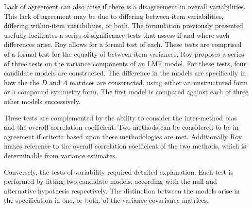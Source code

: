\documentclass[12pt, a4paper]{report}
\theoremstyle{plain}
\theoremstyle{definition}
\theoremstyle{remark}
\begin{document}
Lack of agreement can also arise if there is a disagreement in overall variabilities. This lack of agreement may be due to differing between-item variabilities, differing within-item variabilities, or both. The formulation previously presented usefully facilitates a series of significance tests that assess if and where such differences arise. Roy allows for a formal test of each. These tests are comprised of a formal test for the equality of between-item variances,
Roy proposes a series of three tests on the variance components of an LME model. For these tests, four candidate models are constructed. The difference in the models are specifically in how the the $D$ and $\Lambda$ matrices are constructed, using either an unstructured form or a compound symmetry form. The first model is compared against each of three other models successively.







These tests are complemented by the ability to consider the inter-method bias and the overall correlation coefficient.
Two methods can be considered to be in agreement if criteria based upon these methodologies are met. Additionally Roy makes reference to the overall correlation coefficient of the two methods, which is determinable from variance estimates.

Conversely, the tests of variability required detailed explanation. Each test is performed by fitting two candidate models, according with the null and alternative hypothesis respectively. The distinction between the models arise in the specification in one, or both, of the variance-covariance matrices. %
\end{document}
